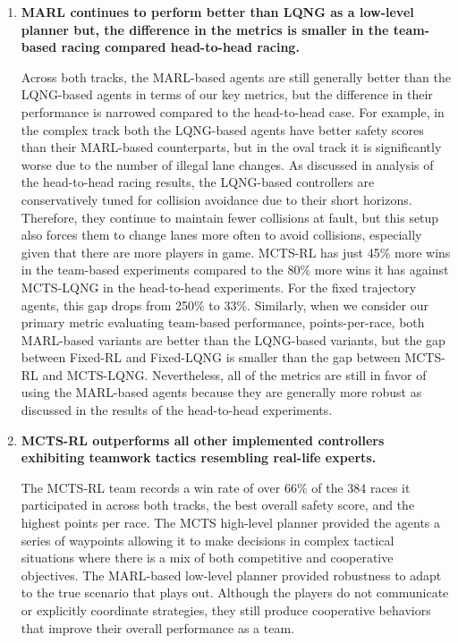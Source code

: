 \begin{enumerate}[wide, labelindent=0pt, font=\bfseries]
\item \textbf{MARL continues to perform better than LQNG as a low-level planner but, the difference in the metrics is smaller in the team-based racing compared head-to-head racing.}  

Across both tracks, the MARL-based agents are still generally better than the LQNG-based agents in terms of our key metrics, but the difference in their performance is narrowed compared to the head-to-head case. For example, in the complex track both the LQNG-based agents have better safety scores than their MARL-based counterparts, but in the oval track it is significantly worse due to the number of illegal lane changes. As discussed in analysis of the head-to-head racing results, the LQNG-based controllers are conservatively tuned for collision avoidance due to their short horizons. Therefore, they continue to maintain fewer collisions at fault, but this setup also forces them to change lanes more often to avoid collisions, especially given that there are more players in game. MCTS-RL has just 45\% more wins in the team-based experiments compared to the 80\% more wins it has against MCTS-LQNG in the head-to-head experiments. For the fixed trajectory agents, this gap drops from 250\% to 33\%. Similarly, when we consider our primary metric evaluating team-based performance, points-per-race, both MARL-based variants are better than the LQNG-based variants, but the gap between Fixed-RL and Fixed-LQNG is smaller than the gap between MCTS-RL and MCTS-LQNG. Nevertheless, all of the metrics are still in favor of using the MARL-based agents because they are generally more robust as discussed in the results of the head-to-head experiments.

\item \textbf{MCTS-RL outperforms all other implemented controllers exhibiting teamwork tactics resembling real-life experts.}  

The MCTS-RL team records a win rate of over 66\% of the 384 races it participated in across both tracks, the best overall safety score, and the highest points per race. The MCTS high-level planner provided the agents a series of waypoints allowing it to make decisions in complex tactical situations where there is a mix of both competitive and cooperative objectives. The MARL-based low-level planner provided robustness to adapt to the true scenario that plays out. Although the players do not communicate or explicitly coordinate strategies, they still produce cooperative behaviors that improve their overall performance as a team. 


\end{enumerate}
